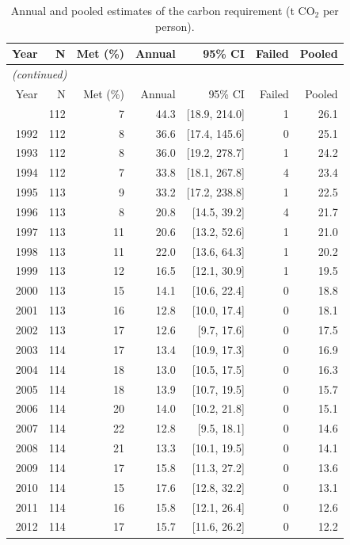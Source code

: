 \begingroup
\footnotesize
\setlength{\tabcolsep}{4pt}
\begin{longtable}{@{}rrrrrrr@{}}
\caption{Annual and pooled estimates of the carbon requirement (t CO$_2$ per person).}\label{tab:reqannual}\\
\toprule
Year & N & Met (\%) & Annual & 95\% CI & Failed & Pooled \\
\midrule
\endfirsthead
\multicolumn{7}{l}{\textit{(continued)}}\\
\toprule
Year & N & Met (\%) & Annual & 95\% CI & Failed & Pooled \\
\midrule
\endhead
\bottomrule
\endfoot
\bottomrule
\endlastfoot
1991 & 112 & 7 & 44.3 & [18.9, 214.0] & 1 & 26.1 \\
1992 & 112 & 8 & 36.6 & [17.4, 145.6] & 0 & 25.1 \\
1993 & 112 & 8 & 36.0 & [19.2, 278.7] & 1 & 24.2 \\
1994 & 112 & 7 & 33.8 & [18.1, 267.8] & 4 & 23.4 \\
1995 & 113 & 9 & 33.2 & [17.2, 238.8] & 1 & 22.5 \\
1996 & 113 & 8 & 20.8 & [14.5, 39.2] & 4 & 21.7 \\
1997 & 113 & 11 & 20.6 & [13.2, 52.6] & 1 & 21.0 \\
1998 & 113 & 11 & 22.0 & [13.6, 64.3] & 1 & 20.2 \\
1999 & 113 & 12 & 16.5 & [12.1, 30.9] & 1 & 19.5 \\
2000 & 113 & 15 & 14.1 & [10.6, 22.4] & 0 & 18.8 \\
2001 & 113 & 16 & 12.8 & [10.0, 17.4] & 0 & 18.1 \\
2002 & 113 & 17 & 12.6 & [9.7, 17.6] & 0 & 17.5 \\
2003 & 114 & 17 & 13.4 & [10.9, 17.3] & 0 & 16.9 \\
2004 & 114 & 18 & 13.0 & [10.5, 17.5] & 0 & 16.3 \\
2005 & 114 & 18 & 13.9 & [10.7, 19.5] & 0 & 15.7 \\
2006 & 114 & 20 & 14.0 & [10.2, 21.8] & 0 & 15.1 \\
2007 & 114 & 22 & 12.8 & [9.5, 18.1] & 0 & 14.6 \\
2008 & 114 & 21 & 13.3 & [10.1, 19.5] & 0 & 14.1 \\
2009 & 114 & 17 & 15.8 & [11.3, 27.2] & 0 & 13.6 \\
2010 & 114 & 15 & 17.6 & [12.8, 32.2] & 0 & 13.1 \\
2011 & 114 & 16 & 15.8 & [12.1, 26.4] & 0 & 12.6 \\
2012 & 114 & 17 & 15.7 & [11.6, 26.2] & 0 & 12.2 \\

\end{longtable}
